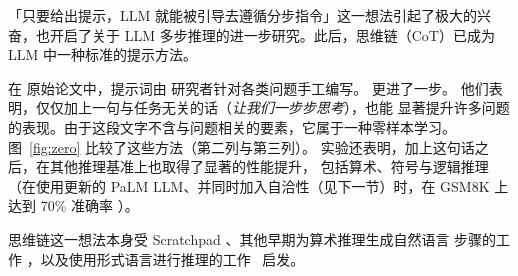 「只要给出提示，LLM 就能被引导去遵循分步指令」这一想法引起了极大的兴奋，也开启了关于 LLM 多步推理的进一步研究。此后，思维链（CoT）已成为 LLM 中一种标准的提示方法。

在
原始论文中，提示词由
研究者针对各类问题手工编写。
\citet{kojima2022large} 更进了一步。
他们表明，仅仅加上一句与任务无关的话（{\em 让我们一步步思考}），也能
显著提升许多问题的表现。由于这段文字不含与问题相关的要素，它属于一种零样本学习。
图~\ref{fig:zero} 比较了这些方法（第二列与第三列）。
实验还表明，加上这句话之后，在其他推理基准上也取得了显著的性能提升，
包括算术、符号与逻辑推理（在使用更新的 PaLM LLM、并同时加入自洽性（见下一节）时，在 GSM8K 上达到 70\% 准确率 \citep{wang2022self}）。

思维链这一想法本身受 Scratchpad \citep{nye2021show}、其他早期为算术推理生成自然语言
步骤的工作
\citep{ling2017program,cobbe2021training}，以及使用形式语言进行推理的工作~\citep{roy2016solving,chiang2018semantically,amini2019mathqa,chen2019neural} 启发。

%

